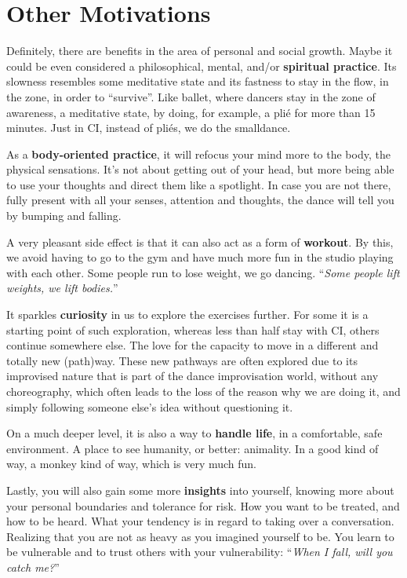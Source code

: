 \section{Other Motivations}\label{sec:other-motivations}

Definitely, there are benefits in the area of personal and social growth.
Maybe it could be even considered a philosophical, mental, and/or \textbf{spiritual practice}.
Its slowness resembles some meditative state and its fastness to stay in the flow, in the zone, in order to ``survive''.
Like ballet, where dancers stay in the zone of awareness, a meditative state, by doing, for example, a plié for more than 15 minutes.
Just in CI, instead of pliés, we do the \gls{smalldance}.

As a \textbf{body-oriented practice}, it will refocus your mind more to the body, the physical sensations.
It's not about getting out of your head, but more being able to use your thoughts and direct them like a spotlight.
In case you are not there, fully present with all your senses, attention and thoughts, the dance will tell you by bumping and falling.

A very pleasant side effect is that it can also act as a form of \textbf{workout}.
By this, we avoid having to go to the gym and have much more fun in the studio playing with each other.
Some people run to lose weight, we go dancing.
``\textit{Some people lift weights, we lift bodies.}''

It sparkles \textbf{curiosity} in us to explore the exercises further.
For some it is a starting point of such exploration, whereas less than half stay with CI, others continue somewhere else.
The love for the capacity to move in a different and totally new (path)way.
These new pathways are often explored due to its improvised nature that is part of the dance improvisation world, without any choreography, which often leads to the loss of the reason why we are doing it, and simply following someone else's idea without questioning it.

On a much deeper level, it is also a way to \textbf{handle life}, in a comfortable, safe environment.
A place to see humanity, or better: animality.
In a good kind of way, a monkey kind of way, which is very much fun.

Lastly, you will also gain some more \textbf{insights} into yourself, knowing more about your personal boundaries and tolerance for risk.
How you want to be treated, and how to be heard.
What your tendency is in regard to taking over a conversation.
Realizing that you are not as heavy as you imagined yourself to be.
You learn to be vulnerable and to trust others with your vulnerability: ``\textit{When I fall, will you catch me?}''


